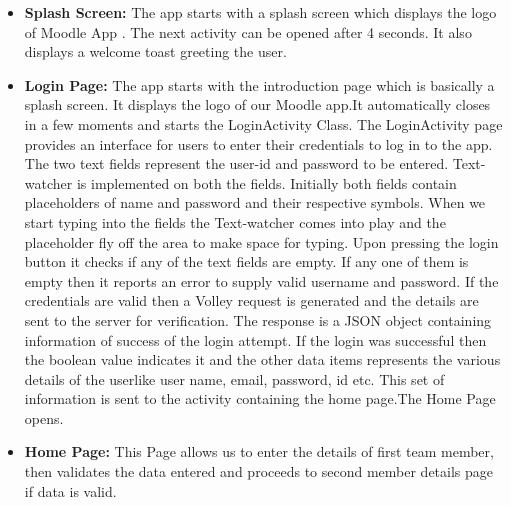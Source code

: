 \documentclass[12pt]{article}
\begin{document}
\begin{itemize}
    \newpage
    \begin{itemize}
    \item \textbf{Splash Screen:} The app starts with a splash screen which displays the logo of Moodle App . The next activity can be opened after 4 seconds. It also displays a welcome toast greeting the user.
    \item \textbf{Login Page:} The app starts with the introduction page which is basically a splash screen. It displays the logo of our Moodle app.It automatically closes in a few moments and starts the LoginActivity Class. The LoginActivity page provides an interface for users to enter their credentials to log in to the app. The two text fields represent the user-id and password to be entered. Text-watcher is implemented on both the fields. Initially both fields contain placeholders of name and password and their respective symbols. When we start typing into the fields the Text-watcher comes into play and the placeholder fly off the area to make space for typing. Upon pressing the login button it checks if any of the text fields are empty. If any one of them is empty then it reports an error to supply valid username and password. If the credentials are valid then a Volley request is generated and the details are sent to the server for verification. The response is a JSON object containing information of success of the login attempt. If the login was successful then the boolean value indicates it and the other data items represents the various details of the userlike user name, email, password, id etc. This set of information is sent to the activity containing the home page.The Home Page opens.
    \item \textbf{Home Page:} This Page allows us to enter the details of first team member, then validates the data entered and proceeds to second member details page if data is valid.
    \end{itemize}
    

\end{itemize}
\end{document}
